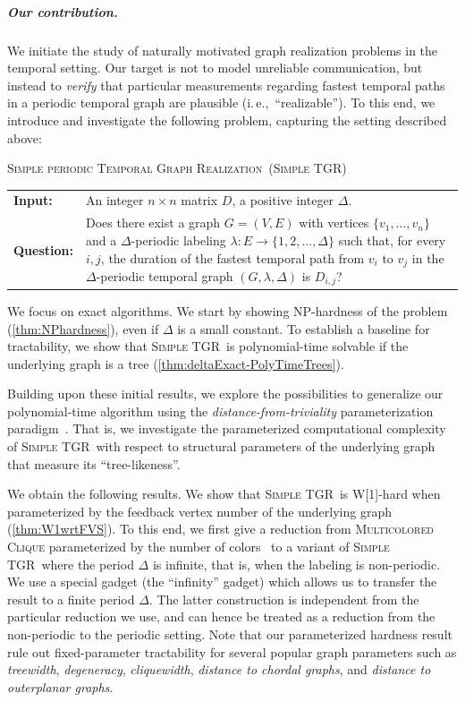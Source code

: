\documentclass[a4paper,UKenglish,cleveref, autoref, thm-restate]{lipics-v2021}
\makeatletter
\newcommand{\ie}{i.\,e.,\ }
\newcommand{\problemdef}[3]{
	\begin{center}
		\begin{minipage}{0.95\textwidth}
			\noindent
			#1
			\vspace{5pt}\\
			\setlength{\tabcolsep}{3pt}
			\begin{tabularx}{\textwidth}{@{}lX@{}}
				\textbf{Input:}& #2 \\
				\textbf{Question:}& #3
			\end{tabularx}
		\end{minipage}
	\end{center}
}
\newcommand{\deltaExactLong}{\textsc{Simple periodic Temporal Graph Realization}}
\newcommand{\deltaExact}{\textsc{Simple TGR}}
\makeatother
\begin{document}
\subparagraph{Our contribution.}
We initiate the study of naturally motivated graph realization problems in the temporal setting. 
Our target is not to model unreliable communication, but instead to \emph{verify} that particular measurements regarding fastest temporal paths in a periodic temporal graph are plausible (\ie ``realizable''). 
To this end, we introduce and investigate the following problem, capturing the setting described above:
	
	
\problemdef{\deltaExactLong\ (\deltaExact)}
{An integer $n \times n$ matrix $D$, a positive integer $\Delta$.}
{Does there exist a graph $G=(V,E)$ with vertices $\{v_1,\ldots,v_{n}\}$ 
and a $\Delta$-periodic labeling $\lambda: E \rightarrow \{1,2,\ldots,\Delta\}$ such that, 
for every $i,j$, the duration of the fastest temporal path from $v_i$ to $v_j$ in the $\Delta$-periodic temporal graph $(G,\lambda,\Delta)$ is $D_{i,j}$?}




We focus on exact algorithms. We start by showing NP-hardness of the problem (\cref{thm:NPhardness}), even if $\Delta$ is a small constant. To establish a baseline for tractability, we show that \deltaExact\ is polynomial-time solvable if the underlying graph is a tree (\cref{thm:deltaExact-PolyTimeTrees}).

Building upon these initial results, we explore the possibilities to generalize our polynomial-time algorithm using the \emph{distance-from-triviality} parameterization paradigm~\cite{FJR13,GHN04}. That is, we investigate the parameterized computational complexity of \deltaExact\ with respect to structural parameters of the underlying graph that measure its ``tree-likeness''.

We obtain the following results. We show that \deltaExact\ is W[1]-hard when parameterized by the feedback vertex number of the underlying graph (\cref{thm:W1wrtFVS}). 
To this end, we first give a reduction from \textsc{Multicolored Clique} parameterized by the number of colors~\cite{fellows2009multipleinterval} to a variant of \deltaExact\ where the period $\Delta$ is infinite, that is, when the labeling is non-periodic. We use a special gadget (the ``infinity'' gadget) which allows us to transfer the result to a finite period $\Delta$. The latter construction is independent from the particular reduction we use, and can hence be treated as a reduction from the non-periodic to the periodic setting.
Note that our parameterized hardness result rule out fixed-parameter tractability for several popular graph parameters such as \emph{treewidth}, \emph{degeneracy}, \emph{cliquewidth}, 
\emph{distance to chordal graphs}, and \emph{distance to outerplanar graphs}.
\end{document}
